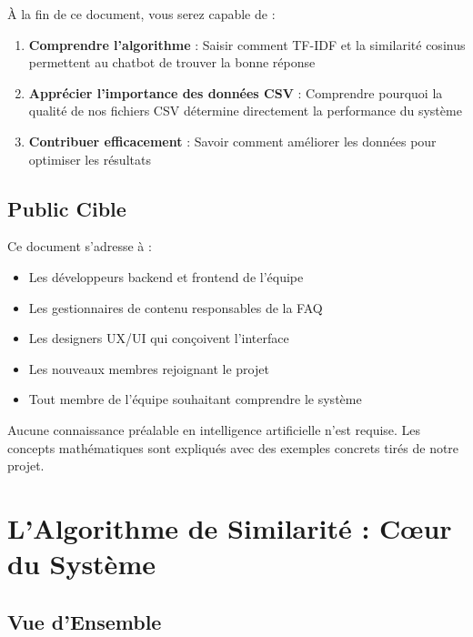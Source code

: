 \documentclass[11pt,a4paper]{article}
\begin{document}
À la fin de ce document, vous serez capable de :

\begin{enumerate}
    \item \textbf{Comprendre l'algorithme} : Saisir comment TF-IDF et la similarité cosinus permettent au chatbot de trouver la bonne réponse
    \item \textbf{Apprécier l'importance des données CSV} : Comprendre pourquoi la qualité de nos fichiers CSV détermine directement la performance du système
    \item \textbf{Contribuer efficacement} : Savoir comment améliorer les données pour optimiser les résultats
    
\end{enumerate}

\subsection{Public Cible}

Ce document s'adresse à :
\begin{itemize}
    \item Les développeurs backend et frontend de l'équipe
    \item Les gestionnaires de contenu responsables de la FAQ
    \item Les designers UX/UI qui conçoivent l'interface
    \item Les nouveaux membres rejoignant le projet
    \item Tout membre de l'équipe souhaitant comprendre le système
\end{itemize}

\begin{astuce}[Prérequis]
Aucune connaissance préalable en intelligence artificielle n'est requise. 
Les concepts mathématiques sont expliqués avec des exemples concrets tirés de notre projet.
\end{astuce}

\clearpage

\section{L'Algorithme de Similarité : Cœur du Système}
\label{sec:algorithme}

\subsection{Vue d'Ensemble}
\end{document}
